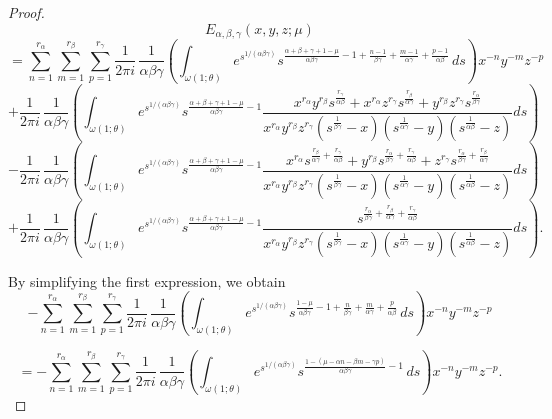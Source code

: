 \documentclass[12pt, reqno]{amsart}
\theoremstyle{definition}
\theoremstyle{remark}
\numberwithin{equation}{section}
\begin{document}
\begin{proof}
$$E_{\alpha,\beta,\gamma}(x,y,z;\mu)$$
$$
=\sum_{n=1}^{r_{\alpha}}
\sum_{m=1}^{r_{\beta}}
\sum_{p=1}^{r_{\gamma}}
\frac{1}{2\pi i}\,
\frac{1}{\alpha\beta\gamma}
\left(\int_{\omega(1;\theta)}
e^{s^{1/(\alpha\beta\gamma)}}s^{\frac{\alpha+\beta+\gamma+1-\mu}{\alpha\beta\gamma}-1+\frac{n-1}{\beta\gamma}+\frac{m-1}{\alpha\gamma}+\frac{p-1}{\alpha\beta}}
\,ds\right)x^{-n}y^{-m}z^{-p}$$
$$+\frac{1}{2\pi i}\,
\frac{1}{\alpha\beta\gamma}
\left(\int_{\omega(1;\theta)}
e^{s^{1/(\alpha\beta\gamma)}}s^{\frac{\alpha+\beta+\gamma+1-\mu}{\alpha\beta\gamma}-1}\frac{
x^{r_{\alpha}}y^{r_{\beta}}
s^{\frac{r_{\gamma}}{\alpha\beta}}
+x^{r_{\alpha}}z^{r_{\gamma}}
s^{\frac{r_{\beta}}{\alpha\gamma}}
+y^{r_{\beta}}z^{r_{\gamma}}
s^{\frac{r_{\alpha}}{\beta\gamma}}
}
{
x^{r_{\alpha}}
y^{r_{\beta}}
z^{r_{\gamma}}
\left(s^{\frac{1}{\beta\gamma}}-x\right)
\left(s^{\frac{1}{\alpha\gamma}}-y\right)
\left(s^{\frac{1}{\alpha\beta}}-z\right)
}ds\right)$$
$$-\frac{1}{2\pi i}\,
\frac{1}{\alpha\beta\gamma}
\left(\int_{\omega(1;\theta)}
e^{s^{1/(\alpha\beta\gamma)}}s^{\frac{\alpha+\beta+\gamma+1-\mu}{\alpha\beta\gamma}-1}\frac{
x^{r_{\alpha}}
s^{\frac{r_{\beta}}{\alpha\gamma}
+\frac{r_{\gamma}}{\alpha\beta}}
+y^{r_{\beta}}
s^{\frac{r_{\alpha}}{\beta\gamma}
+\frac{r_{\gamma}}{\alpha\beta}}
+z^{r_{\gamma}}
s^{\frac{r_{\alpha}}{\beta\gamma}
+\frac{r_{\beta}}{\alpha\gamma}}
}
{
x^{r_{\alpha}}
y^{r_{\beta}}
z^{r_{\gamma}}
\left(s^{\frac{1}{\beta\gamma}}-x\right)
\left(s^{\frac{1}{\alpha\gamma}}-y\right)
\left(s^{\frac{1}{\alpha\beta}}-z\right)
}ds\right)$$
$$+\frac{1}{2\pi i}\,
\frac{1}{\alpha\beta\gamma}
\left(\int_{\omega(1;\theta)}
e^{s^{1/(\alpha\beta\gamma)}}s^{\frac{\alpha+\beta+\gamma+1-\mu}{\alpha\beta\gamma}-1}\frac{
s^{\frac{r_{\alpha}}{\beta\gamma}
+\frac{r_{\beta}}{\alpha\gamma}
+\frac{r_{\gamma}}{\alpha\beta}}
}
{
x^{r_{\alpha}}
y^{r_{\beta}}
z^{r_{\gamma}}
\left(s^{\frac{1}{\beta\gamma}}-x\right)
\left(s^{\frac{1}{\alpha\gamma}}-y\right)
\left(s^{\frac{1}{\alpha\beta}}-z\right)
}ds\right).$$

By simplifying the first expression, we obtain
$$-\sum_{n=1}^{r_{\alpha}}
\sum_{m=1}^{r_{\beta}}
\sum_{p=1}^{r_{\gamma}}
\frac{1}{2\pi i}\,
\frac{1}{\alpha\beta\gamma}
\left(\int_{\omega(1;\theta)}
e^{s^{1/(\alpha\beta\gamma)}}s^{\frac{1-\mu}{\alpha\beta\gamma}-1+\frac{n}{\beta\gamma}+\frac{m}{\alpha\gamma}+\frac{p}{\alpha\beta}}
\,ds\right)x^{-n}y^{-m}z^{-p}$$

$$=-\sum_{n=1}^{r_{\alpha}}\sum_{m=1}^{r_{\beta}}
\sum_{p=1}^{r_{\gamma}}
\frac{1}{2\pi i}\,
\frac{1}{\alpha\beta\gamma}
\left(\int_{\omega(1;\theta)}
e^{s^{1/(\alpha\beta\gamma)}}s^{\frac{1-(\mu-\alpha n-\beta m-\gamma p)}{\alpha\beta\gamma}-1}
\,ds\right)x^{-n}y^{-m}z^{-p}.$$


\end{proof}
\end{document}

